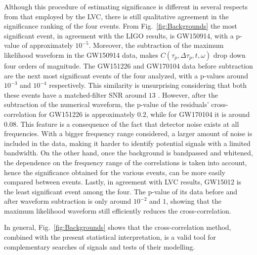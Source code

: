 \documentclass[a4paper,11pt]{article}
\begin{document}
Although this procedure of estimating significance is different in several respects from that employed by the LVC, there is still qualitative agreement in the significance ranking of the four events. From Fig.~\ref{fig:Backgrounds} the most significant event, in agreement with the LIGO results, is GW150914, with a p-value of approximately $10^{-5}$.
Moreover, the subtraction of the maximum likelihood waveform in the GW150914 data, makes $C(\tau_p, \Delta \tau_p, t, \omega)$ drop down four orders of magnitude.
The GW151226 and GW170104 data before subtraction are the next most significant events of the four analyzed, with a p-values around $10^{-3}$ and $10^{-4}$ respectively.
This similarity is unsurprising considering that both these events have a matched-filter SNR around $13$ \cite{LIGOScientific:2018mvr}.
However, after the subtraction of the numerical waveform, the p-value of the residuals' cross-correlation for GW151226 is approximately $0.2$, while for GW170104 it is around $0.08$.
This feature is a consequence of the fact that detector noise exists at all frequencies. With a bigger frequency range considered, a larger amount of noise is included in the data, making it harder to identify potential signals with a limited bandwidth.
On the other hand, once the background is bandpassed and whitened, the dependence on the frequency range of the correlations is taken into account, hence the significance obtained for the various events, can be more easily compared between events. 
Lastly, in agreement with LVC results, GW15012 is the least significant event among the four.
The p-value of its data before and after waveform subtraction is only around $10^{-2}$ and $1$, showing that the maximum likelihood waveform still efficiently reduces the cross-correlation.

In general, Fig.~\ref{fig:Backgrounds} shows that the cross-correlation method, combined with the present statistical interpretation, is a valid tool for complementary searches of signals and tests of their modelling. 
\end{document}
